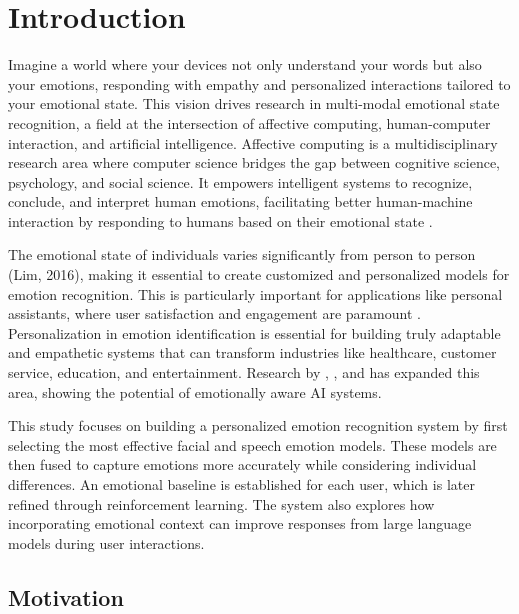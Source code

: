 

\section{Introduction}
\par Imagine a world where your devices not only understand your words but also your emotions, responding with empathy and personalized interactions tailored to your emotional state. This vision drives research in multi-modal emotional state recognition, a field at the intersection of affective computing, human-computer interaction, and artificial intelligence. Affective computing is a multidisciplinary research area where computer science bridges the gap between cognitive science, psychology, and social science. It empowers intelligent systems to recognize, conclude, and interpret human emotions, facilitating better human-machine interaction by responding to humans based on their emotional state \citep{picard2000affective}.


\par The emotional state of individuals varies significantly from person to person (Lim, 2016), making it essential to create customized and personalized models for emotion recognition. This is particularly important for applications like personal assistants, where user satisfaction and engagement are paramount \citep{salama2020deep}. Personalization in emotion identification is essential for building truly adaptable and empathetic systems that can transform industries like healthcare, customer service, education, and entertainment. Research by \cite{gelbrich2021emotional}, \cite{mariacher2021investigating}, and \cite{inkster2018empathy} has expanded this area, showing the potential of emotionally aware AI systems.

\par This study focuses on building a personalized emotion recognition system by first selecting the most effective facial and speech emotion models. These models are then fused to capture emotions more accurately while considering individual differences. An emotional baseline is established for each user, which is later refined through reinforcement learning. The system also explores how incorporating emotional context can improve responses from large language models during user interactions.

\subsection{Motivation}

